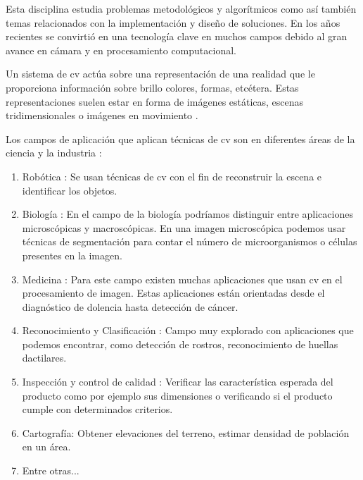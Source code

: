 Esta disciplina estudia problemas metodológicos y algorítmicos como así también temas relacionados con la implementación y diseño de soluciones. En los años recientes se convirtió en una tecnología clave en muchos campos debido al gran avance en cámara y en procesamiento computacional.

Un sistema de \ac{cv} actúa sobre una representación de una realidad que le proporciona información sobre brillo colores, formas, etcétera. Estas representaciones suelen estar en forma de imágenes estáticas, escenas tridimensionales o imágenes en movimiento \citep{Ledda}. 


Los campos de aplicación que aplican técnicas de \ac{cv} son en diferentes áreas de la ciencia y la industria \citep{areascv} :
\begin{enumerate}
\item Robótica : Se usan técnicas de \ac{cv} con el fin de reconstruir la escena e identificar los objetos.
\item Biología : En el campo de la biología podríamos distinguir entre aplicaciones microscópicas y macroscópicas. En una imagen microscópica  podemos  usar técnicas de segmentación para contar el número de microorganismos o células presentes en la imagen.
\item Medicina : Para este campo existen muchas aplicaciones que usan \ac{cv} en el procesamiento de imagen. Estas aplicaciones están orientadas desde el diagnóstico de dolencia hasta detección de cáncer. 
\item  Reconocimiento y Clasificación : Campo muy explorado con aplicaciones que podemos encontrar, como detección de rostros, reconocimiento de huellas dactilares.
\item Inspección y control de calidad : Verificar las característica esperada del producto como por ejemplo sus dimensiones o verificando si el producto cumple con determinados criterios.
\item  Cartografía: Obtener elevaciones del terreno, estimar densidad de población en un área.
\item Entre otras...
\end{enumerate}

